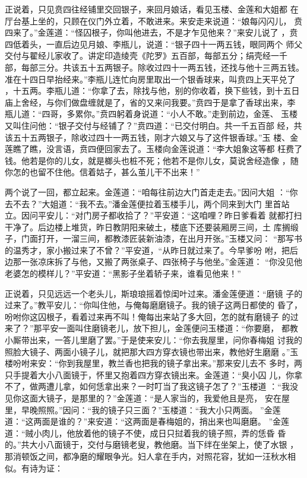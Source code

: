 正说着，只见贲四往经铺里交回银子，来回月娘话，看见玉楼、金莲和大姐都
在厅台基上坐的，只顾在仪门外立着，不敢进来。来安走来说道：“娘每闪闪儿，
贲四来了。”金莲道：“怪囚根子，你叫他进去，不是才乍见他来？”来安儿说了
，贲四低着头，一直后边见月娘、李瓶儿，说道：“银子四十一两五钱，眼同两个
师父交付与翟经儿家收了。讲定印造绫壳《陀罗》五百部，每部五分；绢壳经一千
部，每部三分。共该五十五两银子。除收过四十一两五钱，还找与他十三两五钱。
准在十四日早抬经来。”李瓶儿连忙向房里取出一个银香球来，叫贲四上天平兑了
，十五两。李瓶儿道：“你拿了去，除找与他，别的你收着，换下些钱，到十五日
庙上舍经，与你们做盘缠就是了，省的又来问我要。”贲四于是拿了香球出来，李
瓶儿道：“四哥，多累你。”贲四躬着身说道：“小人不敢。”走到前边，金莲、
玉楼又叫住问他：“银子交付与经铺了？”贲四道：“已交付明白。共一千五百部
经，共该五十五两银子，除收过四十一两五钱，刚才六娘又与了这件银香球。”玉
楼、金莲瞧了瞧，没言语，贲四便回家去了。玉楼向金莲说道：“李大姐象这等都
枉费了钱。他若是你的儿女，就是榔头也桩不死；他若不是你儿女，莫说舍经造像
，随你怎的也留不住他。信着姑子，甚么茧儿干不出来！”

两个说了一回，都立起来。金莲道：“咱每往前边大门首走走去。”因问大姐
：“你去不去？”大姐道：“我不去。”潘金莲便拉着玉楼手儿，两个同来到大门
里首站立。因问平安儿：“对门房子都收拾了？”平安道：“这咱哩？昨日爹看着
就都打扫干净了。后边楼上堆货，昨日教阴阳来破土，楼底下还要装厢房三间，土
库搁缎子，门面打开，一溜三间，都教漆匠装新油漆，在出月开张。”玉楼又问：
“那写书的温秀才，家小搬过来了不曾？”平安道，“从昨日就过来了。今早爹吩
咐，把后边那一张凉床拆了与他，又搬了两张桌子、四张椅子与他坐。”金莲道：
“你没见他老婆怎的模样儿？”平安道：“黑影子坐着轿子来，谁看见他来！”

正说着，只见远远一个老头儿，斯琅琅摇着惊闺叶过来。潘金莲便道：“磨镜
子的过来了。”教平安儿：“你叫住他，与俺每磨磨镜子。我的镜子这两日都使的
昏了，吩咐你这囚根子，看着过来再不叫！俺每出来站了多大回，怎的就有磨镜子
的过来了？”那平安一面叫住磨镜老儿，放下担儿，金莲便问玉楼道：“你要磨，
都教小厮带出来，一答儿里磨了罢。”于是使来安儿：“你去我屋里，问你春梅姐
讨我的照脸大镜子、两面小镜子儿，就把那大四方穿衣镜也带出来，教他好生磨磨
。”玉楼吩咐来安：“你到我屋里，教兰香也把我的镜子拿出来。”那来安儿去不
多时，两只手提着大小八面镜于，怀里又抱着四方穿衣镜出来。金莲道：“臭小囚
儿，你拿不了，做两遭儿拿，如何恁拿出来？一时叮当了我这镜子怎了？”玉楼道
：“我没见你这面大镜子，是那里的？”金莲道：“是人家当的，我爱他且是亮，
安在屋里，早晚照照。”因问：“我的镜子只三面？”玉楼道：“我大小只两面。
”金莲道：“这两面是谁的？”来安道：“这两面是春梅姐的，捎出来也叫磨磨。
”金莲道：“贼小肉儿，他放着他的镜子不使，成日只挝着我的镜子照，弄的恁昏
昏的。”共大小八面镜于，交付与磨镜老叟，教他磨。当下绊在坐架上，使了水银
，那消顿饭之间，都净磨的耀眼争光。妇人拿在手内，对照花容，犹如一汪秋水相
似。有诗为证：

